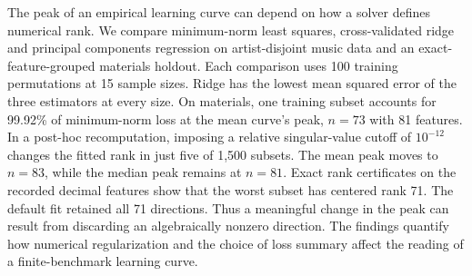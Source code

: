 The peak of an empirical learning curve can depend on how a solver defines numerical rank. We compare minimum-norm least squares, cross-validated ridge and principal components regression on artist-disjoint music data and an exact-feature-grouped materials holdout. Each comparison uses 100 training permutations at 15 sample sizes. Ridge has the lowest mean squared error of the three estimators at every size. On materials, one training subset accounts for 99.92\% of minimum-norm loss at the mean curve's peak, $n=73$ with 81 features. In a post-hoc recomputation, imposing a relative singular-value cutoff of $10^{-12}$ changes the fitted rank in just five of 1,500 subsets. The mean peak moves to $n=83$, while the median peak remains at $n=81$. Exact rank certificates on the recorded decimal features show that the worst subset has centered rank 71. The default fit retained all 71 directions. Thus a meaningful change in the peak can result from discarding an algebraically nonzero direction. The findings quantify how numerical regularization and the choice of loss summary affect the reading of a finite-benchmark learning curve.
